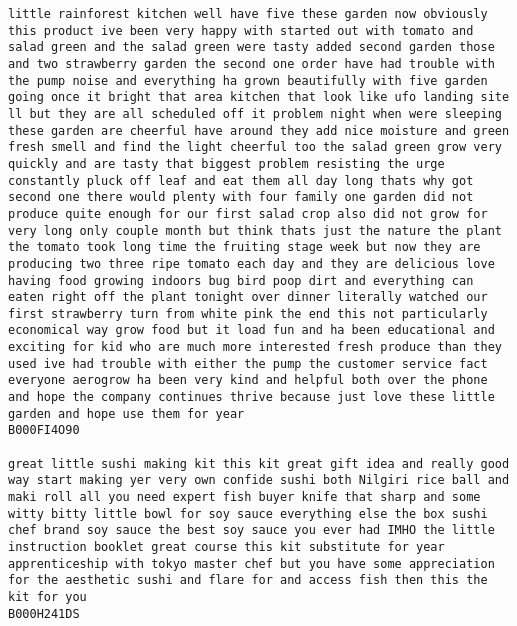 \documentclass[11pt]{article}
\begin{document}
\begin{Verbatim}[commandchars=\\\{\}]
little rainforest kitchen well have five these garden now obviously this product ive been very happy with started out with tomato and salad green and the salad green were tasty added second garden those and two strawberry garden the second one order have had trouble with the pump noise and everything ha grown beautifully with five garden going once it bright that area kitchen that look like ufo landing site ll but they are all scheduled off it problem night when were sleeping these garden are cheerful have around they add nice moisture and green fresh smell and find the light cheerful too the salad green grow very quickly and are tasty that biggest problem resisting the urge constantly pluck off leaf and eat them all day long thats why got second one there would plenty with four family one garden did not produce quite enough for our first salad crop also did not grow for very long only couple month but think thats just the nature the plant the tomato took long time the fruiting stage week but now they are producing two three ripe tomato each day and they are delicious love having food growing indoors bug bird poop dirt and everything can eaten right off the plant tonight over dinner literally watched our first strawberry turn from white pink the end this not particularly economical way grow food but it load fun and ha been educational and exciting for kid who are much more interested fresh produce than they used ive had trouble with either the pump the customer service fact everyone aerogrow ha been very kind and helpful both over the phone and hope the company continues thrive because just love these little garden and hope use them for year
B000FI4O90

great little sushi making kit this kit great gift idea and really good way start making yer very own confide sushi both Nilgiri rice ball and maki roll all you need expert fish buyer knife that sharp and some witty bitty little bowl for soy sauce everything else the box sushi chef brand soy sauce the best soy sauce you ever had IMHO the little instruction booklet great course this kit substitute for year apprenticeship with tokyo master chef but you have some appreciation for the aesthetic sushi and flare for and access fish then this the kit for you
B000H241DS


\end{Verbatim}
\end{document}
